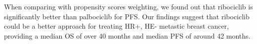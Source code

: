 When comparing with propensity scores weighting, we found out that ribociclib is significantly better than palbociclib for PFS. Our findings suggest that ribociclib could be a better approach for treating HR+, HE- metastic breast cancer, providing a median OS of over 40 months and median PFS of around 42 months. 


